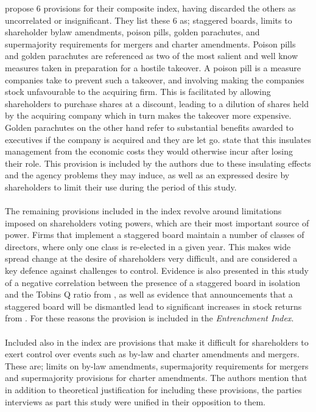 {{\cite{bebchukWhatMatters} propose 6 provisions for their composite index, having discarded the others as uncorrelated or insignificant. They list these 6 as; staggered boards, limits to shareholder bylaw amendments, poison pills, golden parachutes, and supermajority requirements for mergers and charter amendments. Poison pills and golden parachutes are referenced as two of the most salient and well know measures taken in preparation for a hostile takeover. A poison pill is a measure companies take to prevent such a takeover, and involving making the companies stock unfavourable to the acquiring firm. This is facilitated by allowing shareholders to purchase shares at a discount, leading to a dilution of shares held by the acquiring company which in turn makes the takeover more expensive. Golden parachutes on the other hand refer to substantial benefits awarded to executives if the company is acquired and they are let go. \cite{bebchukWhatMatters} state that this insulates management from the economic costs they would otherwise incur after losing their role. This provision is included by the authors due to these insulating effects and the agency problems they may induce, as well as an expressed desire by shareholders to limit their use during the period of this study. \\\\
The remaining provisions included in the index revolve around limitations imposed on shareholders voting powers, which are their most important source of power. Firms that implement a staggered board maintain a number of classes of directors, where only one class is re-elected in a given year. This makes wide spread change at the desire of shareholders very difficult, and are considered a key defence against challenges to control. Evidence is also presented in this study of a negative correlation between the presence of a staggered board in isolation and the Tobins Q ratio from \cite{bebchukTheCosts}, as well as evidence that announcements that a staggered board will be dismantled lead to significant increases in stock returns from  \cite{guoUndoing}. For these reasons the provision is included in the {\it Entrenchment Index}.\\\\
Included also in the index are provisions that make it difficult for shareholders to exert control over events such as by-law and charter amendments and mergers. These are; limits on by-law amendments, supermajority requirements for mergers and supermajority provisions for charter amendments. The authors mention that in addition to theoretical justification for including these provisions, the parties interviews as part this study were unified in their opposition to them. \\\\
}}
